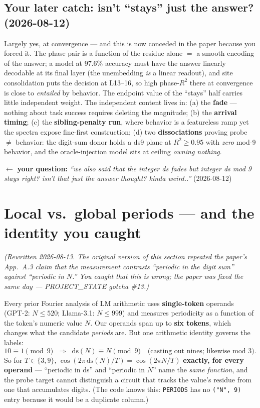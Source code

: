 \documentclass[11pt]{article}
\newcommand{\yourq}[2]{%
  \par\vspace{4pt}\noindent
  \textcolor{qcol}{$\leftarrow$ \textbf{your question:}
  \textit{``#1''}\; \textnormal{(#2)}}\par\vspace{4pt}}
\newcommand{\ds}{\mathrm{ds}}
\begin{document}
\subsection*{Your later catch: isn't ``stays'' just the answer? (2026-08-12)}

Largely yes, at convergence --- and this is now conceded in the paper because you
forced it. The phase pair is a function of the residue alone $=$ a smooth
encoding of the answer; a model at 97.6\% accuracy must have the answer linearly
decodable at its final layer (the unembedding \emph{is} a linear readout), and
site consolidation puts the decision at L13--16, so high phase-$R^2$ there at
convergence is close to \emph{entailed} by behavior. The endpoint value of the
``stays'' half carries little independent weight. The independent content lives
in: (a) the \textbf{fade} --- nothing about task success requires deleting the
magnitude; (b) the \textbf{arrival timing}; (c) the \textbf{sibling-penalty run},
where behavior is a featureless ramp yet the spectra expose fine-first
construction; (d) two \textbf{dissociations} proving probe $\ne$ behavior: the
digit-sum donor holds a ds9 plane at $R^2 \ge 0.95$ with \emph{zero} mod-9
behavior, and the oracle-injection model sits at ceiling \emph{owning nothing}.

\yourq{we also said that the integer ds fades but integer ds mod 9 stays right?
isn't that just the answer thought? kinda weird..}{2026-08-12}

\section{Local vs.\ global periods --- and the identity you caught}
\label{sec:coord}

\emph{(Rewritten 2026-08-13. The original version of this section repeated the
paper's App.~A.3 claim that the measurement contrasts ``periodic in the digit
sum'' against ``periodic in $N$.'' You caught that this is wrong; the paper was
fixed the same day --- PROJECT\_STATE gotcha \#13.)}

Every prior Fourier analysis of LM arithmetic uses \textbf{single-token} operands
(GPT-2: $N \le 520$; Llama-3.1: $N \le 999$) and measures periodicity as a
function of the token's numeric value $N$. Our operands span up to \textbf{six
tokens}, which changes what the candidate \emph{periods} are. But one arithmetic
identity governs the labels:
\[
10 \equiv 1 \!\!\pmod 9 \;\;\Longrightarrow\;\;
\ds(N) \equiv N \!\!\pmod 9 \quad\text{(casting out nines; likewise mod 3)}.
\]
So for $T \in \{3, 9\}$, $\cos(2\pi\,\ds(N)/T) = \cos(2\pi N/T)$ \textbf{exactly,
for every operand} --- ``periodic in ds'' and ``periodic in $N$'' name the
\emph{same function}, and the probe target cannot distinguish a circuit that
tracks the value's residue from one that accumulates digits. (The code knows
this: \texttt{PERIODS} has no \texttt{("N", 9)} entry because it would be a
duplicate column.)
\end{document}
